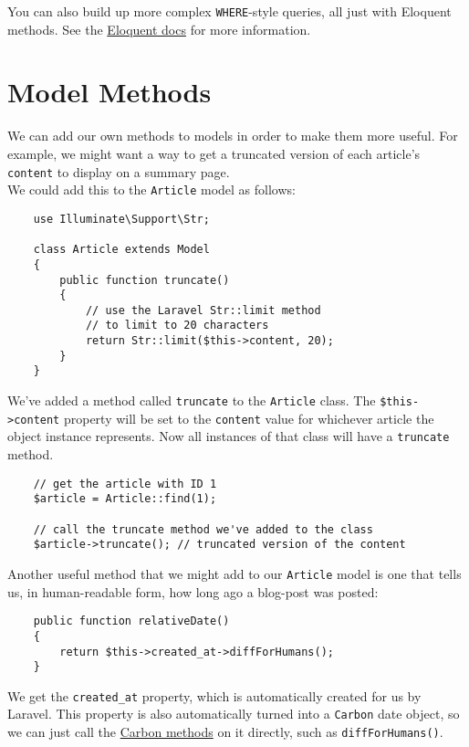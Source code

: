 You can also build up more complex \texttt{WHERE}-style queries, all just with Eloquent methods. See the \href{http://laravel.com/docs/master/eloquent}{Eloquent docs} for more information.


\section{Model Methods}

We can add our own methods to models in order to make them more useful. For example, we might want a way to get a truncated version of each article's \texttt{content} to display on a summary page.
\\

We could add this to the \texttt{Article} model as follows:

\begin{verbatim}
    use Illuminate\Support\Str;

    class Article extends Model
    {
        public function truncate()
        {
            // use the Laravel Str::limit method
            // to limit to 20 characters
            return Str::limit($this->content, 20);
        }
    }
\end{verbatim}

We've added a method called \texttt{truncate} to the \texttt{Article} class.  The \texttt{\$this->content} property will be set to the \texttt{content} value for whichever article the object instance represents. Now all instances of that class will have a \texttt{truncate} method.

\begin{verbatim}
    // get the article with ID 1
    $article = Article::find(1);

    // call the truncate method we've added to the class
    $article->truncate(); // truncated version of the content
\end{verbatim}

Another useful method that we might add to our \texttt{Article} model is one that tells us, in human-readable form, how long ago a blog-post was posted:

\begin{verbatim}
    public function relativeDate()
    {
        return $this->created_at->diffForHumans();
    }
\end{verbatim}

We get the \texttt{created\_at} property, which is automatically created for us by Laravel. This property is also automatically turned into a \texttt{Carbon} date object, so we can just call the \href{https://carbon.nesbot.com/docs/#api-humandiff}{Carbon methods} on it directly, such as \texttt{diffForHumans()}.

